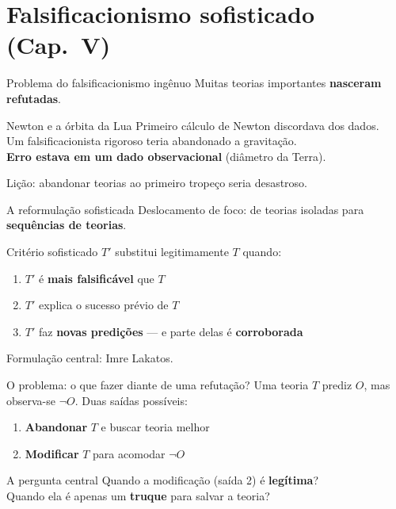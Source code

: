 \documentclass[aspectratio=169]{beamer}
\newcommand{\impt}[1]{\textcolor{maccent}{\textbf{#1}}}
\newcommand{\ntc}[1]{\textcolor{mprimary}{#1}}
\begin{document}
\section{Falsificacionismo sofisticado (Cap.~V)}

\begin{frame}{Problema do falsificacionismo ingênuo}
Muitas teorias importantes \impt{nasceram refutadas}.
\vspace{0.5cm}
\pause
\begin{block}{Newton e a órbita da Lua}
Primeiro cálculo de Newton discordava dos dados. \\
Um falsificacionista rigoroso teria abandonado a gravitação. \\
\pause
\impt{Erro estava em um dado observacional} (diâmetro da Terra).
\end{block}
\pause
\vspace{0.4cm}
\ntc{Lição:} abandonar teorias ao primeiro tropeço seria desastroso.
\end{frame}

\begin{frame}{A reformulação sofisticada}
\ntc{Deslocamento de foco:} de teorias isoladas para \impt{sequências de teorias}.
\vspace{0.4cm}
\pause
\begin{block}{Critério sofisticado}
$T'$ substitui legitimamente $T$ quando:
\begin{enumerate}
  \item $T'$ é \impt{mais falsificável} que $T$
  \item $T'$ explica o sucesso prévio de $T$
  \item $T'$ faz \impt{novas predições} --- e parte delas é \impt{corroborada}
\end{enumerate}
\end{block}
\pause
\vspace{0.3cm}
\ntc{Formulação central:} Imre Lakatos.
\end{frame}
\begin{frame}{O problema: o que fazer diante de uma refutação?}
Uma teoria $T$ prediz $O$, mas observa-se $\neg O$.
\vspace{0.4cm}
\pause
\ntc{Duas saídas possíveis:}
\vspace{0.3cm}
\begin{enumerate}
  \item \impt{Abandonar} $T$ e buscar teoria melhor
  \pause
  \item \impt{Modificar} $T$ para acomodar $\neg O$
\end{enumerate}
\pause
\vspace{0.5cm}
\begin{alertblock}{A pergunta central}
Quando a modificação (saída 2) é \impt{legítima}? \\
Quando ela é apenas um \impt{truque} para salvar a teoria?
\end{alertblock}
\end{frame}
\end{document}
